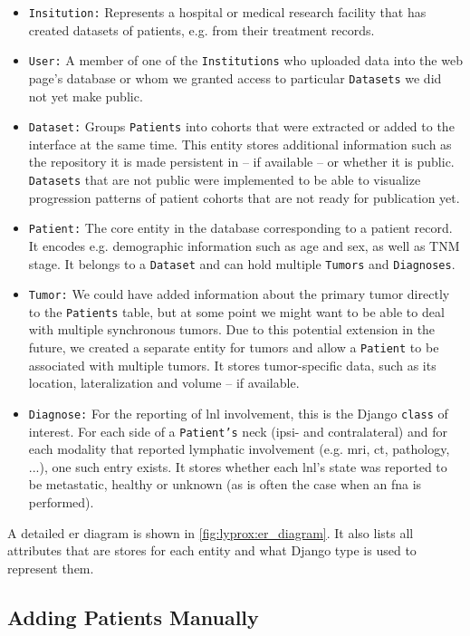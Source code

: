 \documentclass[\relativeRoot/main.tex]{subfiles}
\begin{document}
\begin{itemize}
    \item \texttt{Insitution:} Represents a hospital or medical research facility that has created datasets of patients, e.g. from their treatment records.
    \item \texttt{User:} A member of one of the \texttt{Institutions} who uploaded data into the web page's database or whom we granted access to particular \texttt{Datasets} we did not yet make public.
    \item \texttt{Dataset:} Groups \texttt{Patients} into cohorts that were extracted or added to the interface at the same time. This entity stores additional information such as the repository it is made persistent in -- if available -- or whether it is public. \texttt{Datasets} that are not public were implemented to be able to visualize progression patterns of patient cohorts that are not ready for publication yet.
    \item \texttt{Patient:} The core entity in the database corresponding to a patient record. It encodes e.g. demographic information such as age and sex, as well as TNM stage. It belongs to a \texttt{Dataset} and can hold multiple \texttt{Tumors} and \texttt{Diagnoses}.
    \item \texttt{Tumor:} We could have added information about the primary tumor directly to the \texttt{Patients} table, but at some point we might want to be able to deal with multiple synchronous tumors. Due to this potential extension in the future, we created a separate entity for tumors and allow a \texttt{Patient} to be associated with multiple tumors. It stores tumor-specific data, such as its location, lateralization and volume -- if available.
    \item \texttt{Diagnose:} For the reporting of \acrlong{lnl} involvement, this is the Django \texttt{class} of interest. For each side of a \texttt{Patient's} neck (ipsi- and contralateral) and for each modality that reported lymphatic involvement (e.g. \gls{mri}, \gls{ct}, pathology, ...), one such entry exists. It stores whether each \gls{lnl}'s state was reported to be metastatic, healthy or unknown (as is often the case when an \gls{fna} is performed).
\end{itemize}

A detailed \acrlong{er} diagram is shown in \cref{fig:lyprox:er_diagram}. It also lists all attributes that are stores for each entity and what Django type is used to represent them.

\subsection*{Adding Patients Manually}
\label{subsec:lyprox:implementation:add_manual}
\end{document}
